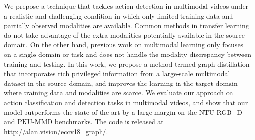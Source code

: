 We propose a technique that tackles action detection in multimodal videos under a realistic and challenging condition in which only limited training data and partially observed modalities are available. 
Common methods in transfer learning do not take advantage of the extra modalities potentially available in the source domain. On the other hand, previous work on multimodal learning only focuses on a single domain or task and does not handle the modality discrepancy between training and testing.
In this work, we propose a method termed graph distillation that incorporates rich privileged information from a large-scale multimodal dataset in the source domain, and improves the learning in the target domain where training data and modalities are scarce. 
We evaluate our approach on action classification and detection tasks in multimodal videos, and show that our model outperforms the state-of-the-art by a large margin on the NTU RGB+D and PKU-MMD benchmarks. The code is released at \url{http://alan.vision/eccv18_graph/}.

